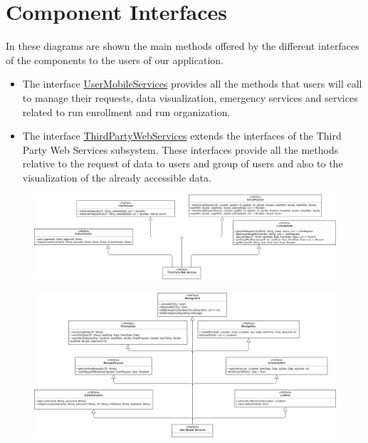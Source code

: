 \section{Component Interfaces}
In these diagrams are shown the main methods offered by the different interfaces of the components to the users of our application.

\begin{itemize}
    \item  The interface \underline{UserMobileServices} provides all the methods that users will call to manage their requests, data visualization, emergency services and services related to run enrollment and run organization.
    \item The interface \underline{ThirdPartyWebServices} extends the interfaces of the Third Party Web Services subsystem. These interfaces provide all the methods relative to the request of data to users and group of users and also to the visualization of the already accessible data.
   \end{itemize}

\begin{figure}[H]
    \centering
    \includegraphics[scale=0.32]{./Pictures/compInterfDiagThirdPDD.png}
   
\end{figure}

\begin{figure}[H]
    \centering
    \includegraphics[scale=0.35]{./Pictures/compInterfDiagUserDD.png}
   
\end{figure}